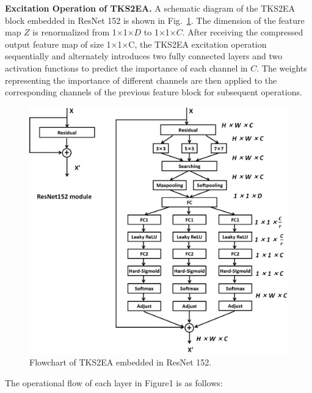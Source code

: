 \documentclass[sn-mathphys]{sn-jnl}%
\theoremstyle{thmstyleone}%
\theoremstyle{thmstyletwo}%
\theoremstyle{thmstylethree}%
\begin{document}
\textbf{Excitation Operation of TKS2EA.} A schematic diagram of the TKS2EA block embedded in ResNet 152 is shown in Fig.~\ref{fig6}. The dimension of the feature map $ Z $ is renormalized from 1×1×$ D $ to 1×1×$ C $. After receiving the compressed output feature map of size 1×1×C, the TKS2EA excitation operation sequentially and alternately introduces two fully connected layers and two activation functions to predict the importance of each channel in $ C $. The weights representing the importance of different channels are then applied to the corresponding channels of the previous feature block for subsequent operations.
\begin{figure}[htbp]
	\centerline{\includegraphics[width=0.65\linewidth]{fig6.png}}
	\caption{Flowchart of TKS2EA embedded in ResNet 152.}
	\label{fig6}
\end{figure}
The operational flow of each layer in Figure1 is as follows:  
\end{document}
